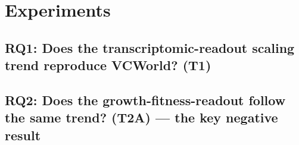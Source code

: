\section{Experiments}


\subsection{RQ1: Does the transcriptomic-readout scaling trend reproduce VCWorld? (T1)}

\subsection{RQ2: Does the growth-fitness-readout follow the same trend? (T2A) — the key negative result}

